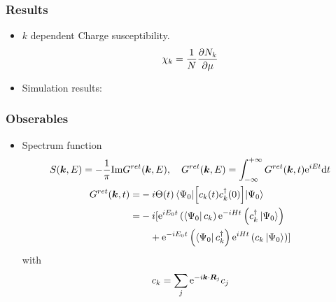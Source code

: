 \documentclass{beamer}
\begin{document}
\begin{frame}
	\frametitle{Results}
	\begin{itemize}
		\item $k$ dependent Charge susceptibility.
		\begin{gather}
			\chi_k = \frac{1}{N}\pdv{N_k}{\mu}
		\end{gather}
		\item Simulation results:
		\begin{figure}[H]
			\centering
			\subfigbottomskip=2pt
			\subfigcapskip=-5pt
		\end{figure}
	\end{itemize}
\end{frame}


\begin{frame}
	\frametitle{Obserables}
	\begin{itemize}
		\item Spectrum function
		\begin{gather}
			S(\vb*{k},E) = -\frac{1}{\pi}\mathrm{Im} G^{ret}(\vb*{k},E),\quad 
			G^{ret}(\vb*{k},E) = \int_{-\infty}^{+\infty} G^{ret}(\vb*{k},t) \mathrm{e}^{iE t}\dd t\\
				\begin{aligned}
					G^{ret}(\vb*{k},t) =& -i\Theta(t)\expval{\left[c_k(t)c_k^\dagger(0)\right]}{\Psi_0}\\
					=&-i[\mathrm{e}^{iE_0t}\left(\bra{\Psi_0}c_k\right)\mathrm{e}^{-iHt}\left(c_k^\dagger\ket{\Psi_0}\right) \\
					&\quad + \mathrm{e}^{-iE_0t}\left(\bra{\Psi_0}c_k^\dagger\right)\mathrm{e}^{iHt}\left(c_k\ket{\Psi_0}\right) ]
				\end{aligned}
		\end{gather}
		with 
		\begin{equation}
			c_k = \sum_{j}\mathrm{e}^{-i\vb*{k}\cdot\vb*{R}_j}c_j
		\end{equation}
	\end{itemize}
\end{frame}
\end{document}

